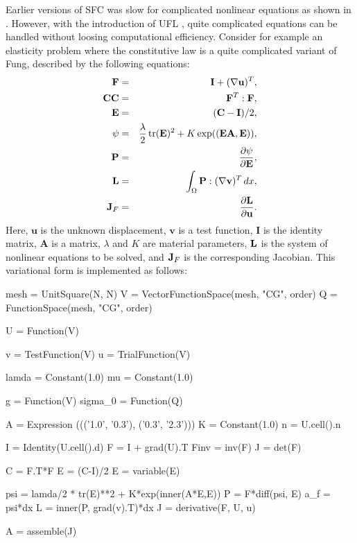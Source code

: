 Earlier versions of SFC was slow for complicated nonlinear equations as shown in \cite{AlnaesMardal2009b}.
However, with the introduction of UFL \cite{AlnaesThesis, AlnaesA.Logg2009}, quite complicated 
equations can be handled without loosing computational efficiency. Consider for example an elasticity problem 
where the constitutive law is a quite complicated variant of Fung, described by 
the following equations: 
\begin{eqnarray}
\mathbf{F} &=& \mathbf{I} + (\nabla \mathbf{u})^T, \\  
\mathbf{CC} &=& \mathbf{F}^T: \mathbf{F}, \\
\mathbf{E} &=& (\mathbf{C}-\mathbf{I})/2, \\ 
\psi &=& \frac{\lambda}{2} \, \mbox{tr}(\mathbf{E})^2 + K\exp((\mathbf{E}\mathbf{A},\mathbf{E})), \\  
\mathbf{P} &=& \frac{\partial \psi}{\partial \mathbf{E}}, \\
\mathbf{L} &=& \int_\Omega \mathbf{P}: (\nabla \mathbf{v})^T \, dx, \\  
\mathbf{J}_F &=& \frac{\partial \mathbf{L}}{\partial \mathbf{u}} . 
\end{eqnarray}
Here, $\mathbf{u}$ is the unknown displacement, $\mathbf{v}$ is a test function, $\mathbf{I}$ is the identity matrix, $\mathbf{A}$ 
is a matrix, $\lambda$ and $K$  are  material parameters, $\mathbf{L}$ is the system of nonlinear equations to be solved, and 
$\mathbf{J}_F$ is the corresponding Jacobian. 
This variational form is implemented as follows: 
\begin{code}
  mesh = UnitSquare(N, N)
  V = VectorFunctionSpace(mesh, "CG", order)
  Q = FunctionSpace(mesh, "CG", order)
  
  U = Function(V)
  
  v = TestFunction(V)
  u = TrialFunction(V)
  
  lamda = Constant(1.0)
  mu = Constant(1.0)
  
  g       = Function(V)
  sigma_0 = Function(Q)
  
  A = Expression ((('1.0', '0.3'), ('0.3', '2.3')))
  K = Constant(1.0)
  n = U.cell().n
  
  I = Identity(U.cell().d)
  F = I + grad(U).T
  Finv = inv(F)
  J = det(F)
  
  C = F.T*F
  E = (C-I)/2
  E = variable(E)
  
  psi = lamda/2 * tr(E)**2  +  K*exp(inner(A*E,E))
  P = F*diff(psi, E)
  a_f = psi*dx
  L = inner(P, grad(v).T)*dx 
  J = derivative(F, U, u)
  
  A = assemble(J)
\end{code}

